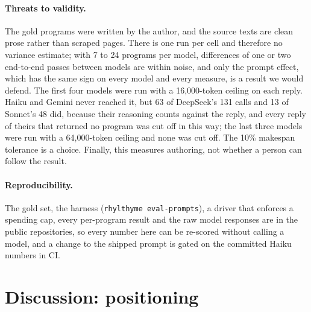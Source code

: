 \documentclass[10pt]{article}
\newcommand{\code}[1]{\texttt{#1}}
\begin{document}
\paragraph{Threats to validity.} The gold programs were written by the author, and the source texts are clean prose rather than scraped pages. There is one run per cell and therefore no variance estimate; with 7 to 24 programs per model, differences of one or two end-to-end passes between models are within noise, and only the prompt effect, which has the same sign on every model and every measure, is a result we would defend. The first four models were run with a 16{,}000-token ceiling on each reply. Haiku and Gemini never reached it, but 63 of DeepSeek's 131 calls and 13 of Sonnet's 48 did, because their reasoning counts against the reply, and every reply of theirs that returned no program was cut off in this way; the last three models were run with a 64{,}000-token ceiling and none was cut off. The 10\% makespan tolerance is a choice. Finally, this measures authoring, not whether a person can follow the result.

\paragraph{Reproducibility.} The gold set, the harness (\code{rhylthyme eval-prompts}), a driver that enforces a spending cap, every per-program result and the raw model responses are in the public repositories, so every number here can be re-scored without calling a model, and a change to the shipped prompt is gated on the committed Haiku numbers in CI.

\section{Discussion: positioning}
\label{sec:discussion}
\end{document}

